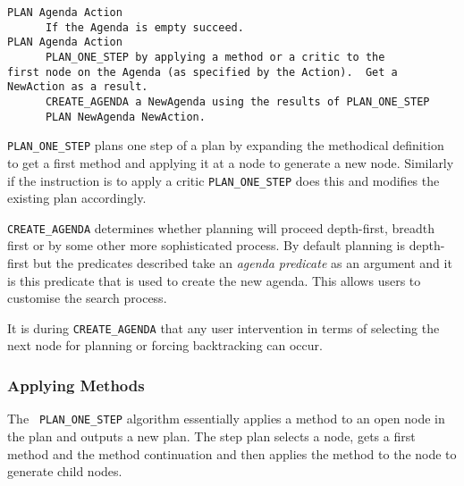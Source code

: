 \begin{verbatim}
PLAN Agenda Action
      If the Agenda is empty succeed.
PLAN Agenda Action
      PLAN_ONE_STEP by applying a method or a critic to the
first node on the Agenda (as specified by the Action).  Get a
NewAction as a result.
      CREATE_AGENDA a NewAgenda using the results of PLAN_ONE_STEP
      PLAN NewAgenda NewAction.
\end{verbatim}

{\tt PLAN\_ONE\_STEP} plans one step of a plan by expanding the
methodical 
definition to get a first method and applying it at a node to generate 
a new node.  Similarly if the instruction is to apply a
critic {\tt PLAN\_ONE\_STEP} does this and modifies the
existing plan accordingly.

{\tt CREATE\_AGENDA} determines whether planning will proceed
depth-first, breadth first or
by some other more sophisticated process.  By default planning is
depth-first but the predicates described take an {\em agenda
  predicate} as an argument and it is this
predicate that is used to create the new agenda.  This allows users to 
customise the search process.

It is during {\tt CREATE\_AGENDA} that any user intervention in terms
of selecting the next node for planning or forcing
backtracking can occur.  

\subsubsection{Applying Methods}
\label{planonestep}

The {\tt
  PLAN\_ONE\_STEP} algorithm essentially applies a method to an open node
in the plan and outputs a new plan.  The step plan selects a node, gets
a first method 
and the method continuation and then applies the method to the node to 
generate child nodes.

